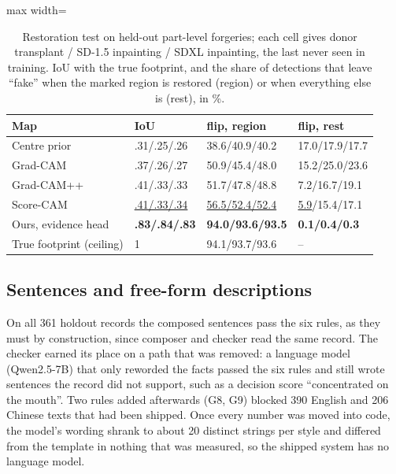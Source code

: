 \documentclass[conference,a4paper]{IEEEtran}
\begin{document}
\begin{table}[!htb]
\centering
\caption{Restoration test on held-out part-level forgeries; each cell gives donor transplant / SD-1.5 inpainting / SDXL
inpainting, the last never seen in training. IoU with the true footprint, and the share of detections that leave ``fake''
when the marked region is restored (region) or when everything else is (rest), in \%.}
\label{tab:restore}
\footnotesize
\setlength{\tabcolsep}{3pt}
\begin{adjustbox}{max width=\columnwidth}
\begin{tabular}{@{}llll@{}}
\toprule
Map & IoU & flip, region & flip, rest \\
\midrule
Centre prior & .31/.25/.26 & 38.6/40.9/40.2 & 17.0/17.9/17.7 \\
Grad-CAM~\cite{gradcam} & .37/.26/.27 & 50.9/45.4/48.0 & 15.2/25.0/23.6 \\
Grad-CAM++~\cite{gradcampp} & .41/.33/.33 & 51.7/47.8/48.8 & 7.2/16.7/19.1 \\
Score-CAM~\cite{scorecam} & \underline{.41/.33/.34} & \underline{56.5/52.4/52.4} & \underline{5.9}/15.4/17.1 \\
Ours, evidence head & \textbf{.83/.84/.83} & \textbf{94.0/93.6/93.5} & \textbf{0.1/0.4/0.3} \\
\midrule
True footprint (ceiling) & 1 & 94.1/93.7/93.6 & -- \\
\bottomrule
\end{tabular}
\end{adjustbox}
\end{table}


\subsection{Sentences and free-form descriptions}
\label{sec:res-text}

On all 361 holdout records the composed sentences pass the six rules, as they must by construction, since composer and checker
read the same record. The checker earned its place on a path that was removed: a language model (Qwen2.5-7B) that only reworded
the facts passed the six rules and still wrote sentences the record did not support, such as a decision score ``concentrated
on the mouth''. Two rules added afterwards (G8, G9) blocked 390 English and 206 Chinese texts that had been shipped. Once every
number was moved into code, the model's wording shrank to about 20 distinct strings per style and differed from the template
in nothing that was measured, so the shipped system has no language model.
\end{document}
